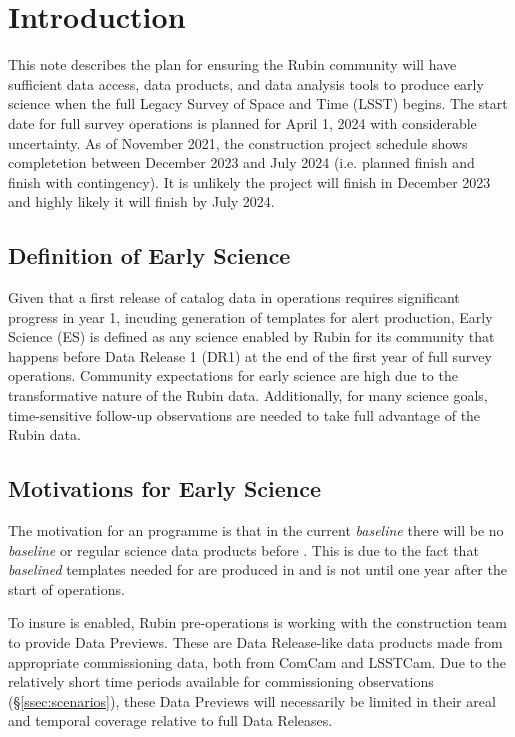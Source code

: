 \section{Introduction}

This  note describes the plan for ensuring the Rubin community will have sufficient data access, data products, and data analysis tools to produce early science when the full Legacy Survey of Space and Time (LSST)  begins. 
The start date for full survey operations is planned for April 1, 2024 with considerable uncertainty. As of November 2021, the construction project schedule shows completetion between December 2023 and July 2024 (i.e. planned finish and finish with contingency). 
It is unlikely the project will finish in December 2023 and highly likely it will finish by July 2024. 

\subsection{Definition of Early Science}  \label{ssec:defn}

Given that a first release of catalog data in operations requires significant progress in year 1, incuding generation of templates for alert production, Early Science (ES) is defined as any science enabled by Rubin for its community that happens before Data Release 1 (DR1) at the end of the first year of full survey operations. 
Community expectations for early science are high due to the transformative nature of the Rubin data.  
Additionally, for many science goals, time-sensitive follow-up observations are needed to take full advantage of the Rubin data.

\subsection{Motivations for Early Science}
The motivation for an \es programme is that in the current {\it baseline} there will be no {\it baseline} or regular science data products before \drone. 
This is due to the fact that {\it baselined} templates needed for \diffim are produced in \drp and \drone is not until one year after the start of operations.

To insure \es is enabled, Rubin pre-operations is working with the construction team to provide Data Previews. These are Data Release-like data products made from appropriate commissioning data, both from ComCam and LSSTCam. 
Due to the relatively short time periods available for commissioning observations (\S \ref{ssec:scenarios}), these Data Previews will necessarily be limited in their areal and temporal coverage relative to full Data Releases.

